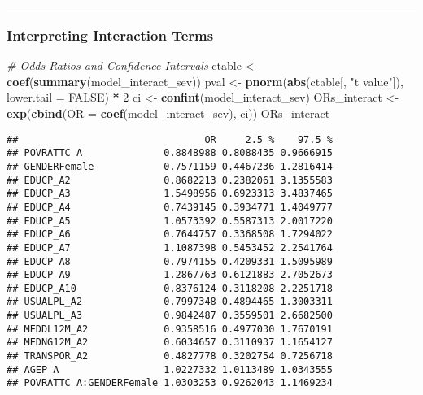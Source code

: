 \documentclass[
]{article}
\newenvironment{Shaded}{\begin{snugshade}}{\end{snugshade}}
\newcommand{\AttributeTok}[1]{\textcolor[rgb]{0.13,0.29,0.53}{#1}}
\newcommand{\CommentTok}[1]{\textcolor[rgb]{0.56,0.35,0.01}{\textit{#1}}}
\newcommand{\ConstantTok}[1]{\textcolor[rgb]{0.56,0.35,0.01}{#1}}
\newcommand{\DecValTok}[1]{\textcolor[rgb]{0.00,0.00,0.81}{#1}}
\newcommand{\FunctionTok}[1]{\textcolor[rgb]{0.13,0.29,0.53}{\textbf{#1}}}
\newcommand{\NormalTok}[1]{#1}
\newcommand{\OtherTok}[1]{\textcolor[rgb]{0.56,0.35,0.01}{#1}}
\newcommand{\SpecialCharTok}[1]{\textcolor[rgb]{0.81,0.36,0.00}{\textbf{#1}}}
\newcommand{\StringTok}[1]{\textcolor[rgb]{0.31,0.60,0.02}{#1}}
\begin{document}
\begin{center}\rule{0.5\linewidth}{0.5pt}\end{center}

\subsubsection{Interpreting Interaction
Terms}\label{interpreting-interaction-terms}

\begin{Shaded}
\begin{Highlighting}[]
\CommentTok{\# Odds Ratios and Confidence Intervals}
\NormalTok{ctable }\OtherTok{\textless{}{-}} \FunctionTok{coef}\NormalTok{(}\FunctionTok{summary}\NormalTok{(model\_interact\_sev))}
\NormalTok{pval }\OtherTok{\textless{}{-}} \FunctionTok{pnorm}\NormalTok{(}\FunctionTok{abs}\NormalTok{(ctable[, }\StringTok{"t value"}\NormalTok{]), }\AttributeTok{lower.tail =} \ConstantTok{FALSE}\NormalTok{) }\SpecialCharTok{*} \DecValTok{2}
\NormalTok{ci }\OtherTok{\textless{}{-}} \FunctionTok{confint}\NormalTok{(model\_interact\_sev)}
\NormalTok{ORs\_interact }\OtherTok{\textless{}{-}} \FunctionTok{exp}\NormalTok{(}\FunctionTok{cbind}\NormalTok{(}\AttributeTok{OR =} \FunctionTok{coef}\NormalTok{(model\_interact\_sev), ci))}
\NormalTok{ORs\_interact}
\end{Highlighting}
\end{Shaded}

\begin{verbatim}
##                                OR     2.5 %    97.5 %
## POVRATTC_A              0.8848988 0.8088435 0.9666915
## GENDERFemale            0.7571159 0.4467236 1.2816414
## EDUCP_A2                0.8682213 0.2382061 3.1355583
## EDUCP_A3                1.5498956 0.6923313 3.4837465
## EDUCP_A4                0.7439145 0.3934771 1.4049777
## EDUCP_A5                1.0573392 0.5587313 2.0017220
## EDUCP_A6                0.7644757 0.3368508 1.7294022
## EDUCP_A7                1.1087398 0.5453452 2.2541764
## EDUCP_A8                0.7974155 0.4209331 1.5095989
## EDUCP_A9                1.2867763 0.6121883 2.7052673
## EDUCP_A10               0.8376124 0.3118208 2.2251718
## USUALPL_A2              0.7997348 0.4894465 1.3003311
## USUALPL_A3              0.9842487 0.3559501 2.6682500
## MEDDL12M_A2             0.9358516 0.4977030 1.7670191
## MEDNG12M_A2             0.6034657 0.3110937 1.1654127
## TRANSPOR_A2             0.4827778 0.3202754 0.7256718
## AGEP_A                  1.0227332 1.0113489 1.0343555
## POVRATTC_A:GENDERFemale 1.0303253 0.9262043 1.1469234
\end{verbatim}
\end{document}
